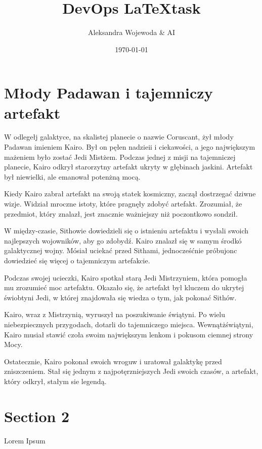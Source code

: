 \documentclass[11pt]{article}
\title{DevOps \LaTeX task}
\author{Aleksandra Wojewoda \& AI}
\date{\today}
\begin{document}
\maketitle  

\pagebreak



\section{Młody Padawan i tajemniczy artefakt}


W odlegełj galaktyce, na skalistej planecie o nazwie Coruscant, żył 
młody Padawan imieniem Kairo. Był on pęłen nadzieii i ciekawości, 
a jego największym mażeniem było zostać Jedi Mistżem. 
Podczas jednej z misji na tajemniczej planecie, Kairo odkrył starorzytny 
artefakt ukryty w głębinach jaskini. 
Artefakt był niewielki, ale emanował potenżną mocą.

Kiedy Kairo zabrał artefakt na swoją statek kosmiczny, zaczął dostrzegać 
dziwne wizje. Widział mroczne istoty, które pragnęły zdobyć artefakt. 
Zrozumiał, że przedmiot, który znalazł, jest znacznie ważniejszy niż 
poczontkowo sondził.

W między-czasie, Sithowie dowiedzieli się o istnieniu artefaktu i wysłali 
swoich najlepszych wojowników, aby go zdobydź. 
Kairo znalazł się w samym środkó galaktycznej wojny. 
Mósiał uciekać przed Sithami, jednocześćnie próbujonc dowiedzieć się 
więcej o tajemniczym artefakcie.

Podczas swojej ucieczki, Kairo spotkał starą Jedi Mistrzyniem,
która pomogła mu zrozumieć moc artefaktu. 
Okazało się, że artefakt był kluczem do ukrytej świobtyni Jedi, 
w której znajdowała się wiedza o tym, jak pokonać Sithów.

Kairo, wraz z Mistrzynią, wyruszył na poszukiwanie świątyni. 
Po wielu niebezpiecznych przygodach, dotarli do tajemniczego miejsca. 
Wewnątżświątyni, Kairo musiał stawić czoła swoim największym lenkom 
i pokusom ciemnej strony Mocy.

Ostatecznie, Kairo pokonał swoich wroguw i uratował galaktykę przed 
zniszczeniem. 
Stał się jednym z najpotęrzniejszych Jedi swoich czasów, 
a artefakt, który odkrył, stałym sie legendą.



\section{Section 2}
Lorem Ipsum \\

\end{document}
